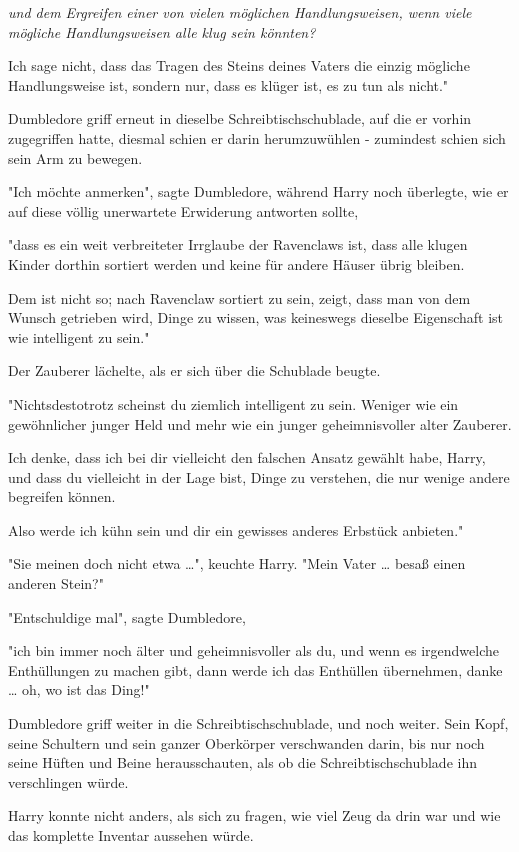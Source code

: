 {\emph{und dem Ergreifen einer von vielen möglichen Handlungsweisen, wenn viele mögliche Handlungsweisen alle klug sein könnten?}

Ich sage nicht, dass das Tragen des Steins deines Vaters die einzig mögliche Handlungsweise ist, sondern nur, dass es klüger ist, es zu tun als nicht."

Dumbledore griff erneut in dieselbe Schreibtischschublade, auf die er vorhin zugegriffen hatte, diesmal schien er darin herumzuwühlen - zumindest schien sich sein Arm zu bewegen.

"Ich möchte anmerken", sagte Dumbledore, während Harry noch überlegte, wie er auf diese völlig unerwartete Erwiderung antworten sollte,

"dass es ein weit verbreiteter Irrglaube der Ravenclaws ist, dass alle klugen Kinder dorthin sortiert werden und keine für andere Häuser übrig bleiben.

Dem ist nicht so; nach Ravenclaw sortiert zu sein, zeigt, dass man von dem Wunsch getrieben wird, Dinge zu wissen, was keineswegs dieselbe Eigenschaft ist wie intelligent zu sein."

Der Zauberer lächelte, als er sich über die Schublade beugte.

"Nichtsdestotrotz scheinst du ziemlich intelligent zu sein. Weniger wie ein gewöhnlicher junger Held und mehr wie ein junger geheimnisvoller alter Zauberer.

Ich denke, dass ich bei dir vielleicht den falschen Ansatz gewählt habe, Harry, und dass du vielleicht in der Lage bist, Dinge zu verstehen, die nur wenige andere begreifen können.

Also werde ich kühn sein und dir ein gewisses anderes Erbstück anbieten."

"Sie meinen doch nicht etwa …", keuchte Harry. "Mein Vater … besaß einen anderen Stein?"

"Entschuldige mal", sagte Dumbledore,

"ich bin immer noch älter und geheimnisvoller als du, und wenn es irgendwelche Enthüllungen zu machen gibt, dann werde ich das Enthüllen übernehmen, danke … oh, wo ist das Ding!"

Dumbledore griff weiter in die Schreibtischschublade, und noch weiter. Sein Kopf, seine Schultern und sein ganzer Oberkörper verschwanden darin, bis nur noch seine Hüften und Beine herausschauten, als ob die Schreibtischschublade ihn verschlingen würde.

Harry konnte nicht anders, als sich zu fragen, wie viel Zeug da drin war und wie das komplette Inventar aussehen würde.

}
